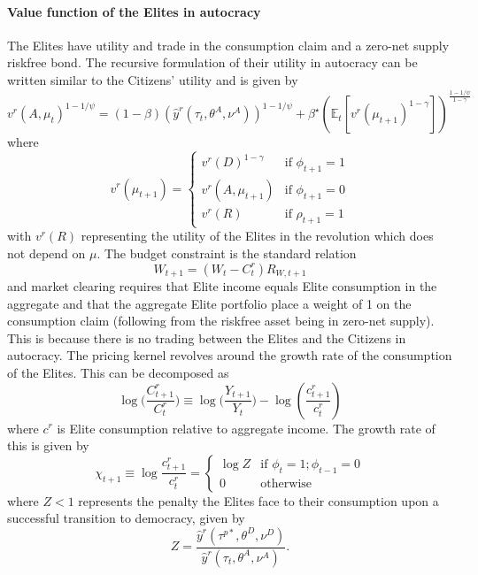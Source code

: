 \documentclass[12pt]{article}
\numberwithin{equation}{section}
\begin{document}
\paragraph{Value function of the Elites in autocracy}

The Elites have \citeauthor{Epstein1989} utility and trade in the consumption claim and a zero-net supply riskfree bond. The recursive formulation of their utility in autocracy can be written similar to the Citizens' utility and is given by
\begin{equation}
	v^{r}(A,\mu_{t})^{1-1/\psi}=(1-\beta)(\hat{y}^{r} (\tau_t,\theta^{A},\nu^A))^{1-1/\psi}+\beta^{\star}\left(\mathbb{E}_{t}\left[v^r(\mu_{t+1})^{1-\gamma}\right]\right)^{\frac{1-1/\psi}{1-\gamma}}
\end{equation}
where
\begin{equation*}
v^r(\mu_{t+1})=\begin{cases}
v^{r}(D)^{1-\gamma} & \text{if } \phi_{t+1} = 1 \\
v^{r}(A,\mu_{t+1}) & \text{if }\phi_{t+1} = 0 \\
v^r(R) & \text{if }\rho_{t+1} = 1
\end{cases}
\end{equation*}
with $v^r(R)$ representing the utility of the Elites in the revolution which does not depend on $\mu$. The budget constraint is the standard relation
\begin{equation}
W_{t+1} = (W_t-C_t^r)R_{W,t+1}
\label{eq:budgetconstraint_ez}
\end{equation}
and market clearing requires that Elite income equals Elite consumption in the aggregate and that the aggregate Elite portfolio place a weight of 1 on the consumption claim (following from the riskfree asset being in zero-net supply). This is because there is no trading between the Elites and the Citizens in autocracy. The pricing kernel revolves around the growth rate of the consumption of the Elites. This can be decomposed as
\begin{equation}
\log \bigg(\frac{C_{t+1}^r}{C_{t}^r} \bigg) \equiv \log \bigg(\frac{Y_{t+1}}{Y_{t}}\bigg)- \log\left(\frac{c_{t+1}^{r}}{c_{t}^{r}}\right)
\end{equation}
where $c^r$ is Elite consumption relative to aggregate income. The growth rate of this is given by
\begin{equation}
 \chi_{t+1} \equiv \log \frac{c_{t+1}^{r}}{c_{t}^{r}} = \begin{cases} 
\log Z & \textrm{if }\phi_{t}=1;\phi_{t-1}=0 \\
0 & \textrm{otherwise}
\end{cases} 
\end{equation}
where $Z<1$ represents the penalty the Elites face to their consumption upon a successful transition to democracy, given by
\begin{equation}
	Z= \frac{\hat{y}^{r} (\tau^{p*},\theta^{D},\nu^D)}{\hat{y}^{r} (\tau_t,\theta^{A},\nu^A)}.
\end{equation}
\end{document}
